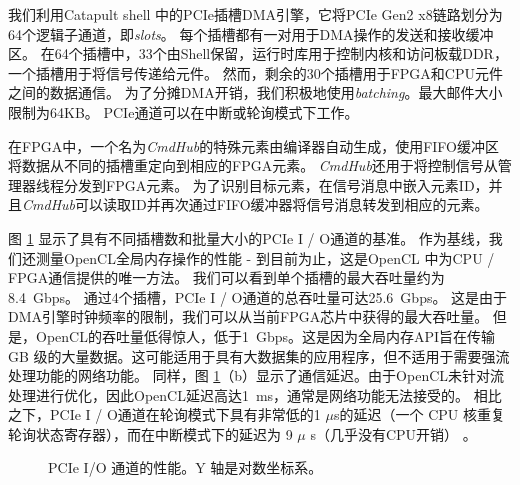 我们利用Catapult shell \cite {putnam2014reconfigurable}中的PCIe插槽DMA引擎，它将PCIe Gen2 x8链路划分为64个逻辑子通道，即\textit {slots}。
每个插槽都有一对用于DMA操作的发送和接收缓冲区。
在64个插槽中，33个由Shell保留，运行时库用于控制内核和访问板载DDR，一个插槽用于将信号传递给\name 元件。
然而，剩余的30个插槽用于FPGA和CPU元件之间的数据通信。
为了分摊DMA开销，我们积极地使用\textit {batching}。最大邮件大小限制为64KB。
PCIe通道可以在中断或轮询模式下工作。


在FPGA中，一个名为\textit {CmdHub}的特殊元素由\name 编译器自动生成，使用FIFO缓冲区将数据从不同的插槽重定向到相应的FPGA元素。
\textit {CmdHub}还用于将控制信号从管理器线程分发到FPGA元素。
为了识别目标元素，在信号消息中嵌入元素ID，并且\textit {CmdHub}可以读取ID并再次通过FIFO缓冲器将信号消息转发到相应的元素。

图 \ref {clicknp:fig:pcie} 显示了具有不同插槽数和批量大小的PCIe I / O通道的基准。
作为基线，我们还测量OpenCL全局内存操作的性能 - 到目前为止，这是OpenCL \cite {opencl}中为CPU / FPGA通信提供的唯一方法。
我们可以看到单个插槽的最大吞吐量约为8.4~Gbps。
通过4个插槽，PCIe I / O通道的总吞吐量可达25.6~Gbps。
这是由于DMA引擎时钟频率的限制，我们可以从当前FPGA芯片中获得的最大吞吐量。
但是，OpenCL的吞吐量低得惊人，低于1~Gbps。这是因为全局内存API旨在传输 GB 级的大量数据。这可能适用于具有大数据集的应用程序，但不适用于需要强流处理功能的网络功能。
同样，图 \ref {clicknp:fig:pcie}（b）显示了通信延迟。由于OpenCL未针对流处理进行优化，因此OpenCL延迟高达1~ms，通常是网络功能无法接受的。
相比之下，PCIe I / O通道在轮询模式下具有非常低的1 $\mu$s的延迟（一个 CPU 核重复轮询状态寄存器），而在中断模式下的延迟为 9 $\mu$ s（几乎没有CPU开销） 。

\begin{figure}[htbp]
	\centering

	\caption{PCIe I/O 通道的性能。Y 轴是对数坐标系。}

	\label{clicknp:fig:pcie}
\end{figure}

